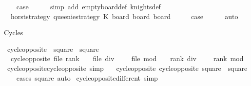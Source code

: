 \begin{isabellebody}
\ \ \isamarkupfalse%
\ {\isacharquery}case\isanewline
\ \ \ \ \isamarkupfalse%
\ {\isacharparenleft}simp\ add{\isacharcolon}\ empty{\isacharunderscore}board{\isacharunderscore}def\ knights{\isacharunderscore}def{\isacharparenright}\isanewline
{}\isamarkupfalse%
\isanewline
\ \ \isamarkupfalse%
\ {\isacharparenleft}{}\ horst{\isacharunderscore}strategy\ queenie{\isacharunderscore}strategy\ K\ board\ board{\isacharprime}\ board{\isacharprime}{\isacharprime}{\isacharparenright}\isanewline
\ \ \isamarkupfalse%
\ \isamarkupfalse%
\ {\isacharquery}case\isanewline
\ \ \ \ \isamarkupfalse%
\ auto\isanewline
{}\isamarkupfalse%
%
\endisatagproof
{\isafoldproof}%
%
\isadelimproof
%
\endisadelimproof
%
\begin{isamarkuptext}%
Cycles%
\end{isamarkuptext}\isamarkuptrue%
\isamarkupfalse%
\ cycle{\isacharunderscore}opposite\ {\isacharcolon}{\isacharcolon}\ {\isachardoublequoteopen}square\ {\isasymRightarrow}\ square{\isachardoublequoteclose}\ \ \isanewline
\ \ {\isachardoublequoteopen}cycle{\isacharunderscore}opposite\ {\isacharparenleft}file{\isacharcomma}\ rank{\isacharparenright}\ {\isacharequal}\ {\isacharparenleft}{}\ {\isacharasterisk}\ {\isacharparenleft}file\ div\ {}{\isacharparenright}\ {\isacharplus}\ {\isacharparenleft}{}\ {\isacharminus}\ file\ mod\ {}{\isacharparenright}{\isacharcomma}\ {}\ {\isacharasterisk}\ {\isacharparenleft}rank\ div\ {}{\isacharparenright}\ {\isacharplus}\ {\isacharparenleft}{}\ {\isacharminus}\ rank\ mod\ {}{\isacharparenright}{\isacharparenright}{\isachardoublequoteclose}\isanewline
\isanewline
{}\isamarkupfalse%
\ cycle{\isacharunderscore}opposite{\isacharunderscore}cycle{\isacharunderscore}opposite\ {\isacharbrackleft}simp{\isacharbrackright}{\isacharcolon}\isanewline
\ \ \ {\isachardoublequoteopen}cycle{\isacharunderscore}opposite\ {\isacharparenleft}cycle{\isacharunderscore}opposite\ square{\isacharparenright}\ {\isacharequal}\ square{\isachardoublequoteclose}\isanewline
%
\isadelimproof
\ \ %
\endisadelimproof
%
\isatagproof
{}\isamarkupfalse%
\ {\isacharparenleft}cases\ square{\isacharparenright}\ auto%
\endisatagproof
{\isafoldproof}%
%
\isadelimproof
\isanewline
%
\endisadelimproof
\isanewline
{}\isamarkupfalse%
\ cycle{\isacharunderscore}opposite{\isacharunderscore}different\ {\isacharbrackleft}simp{\isacharbrackright}{\isacharcolon}\isanewline

\end{isabellebody}
